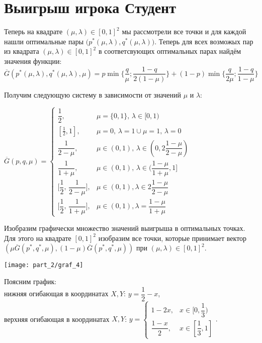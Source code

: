 \section{Выигрыш игрока Студент}

\quad Теперь на квадрате $(\mu, \lambda) \in [0, 1]^2$ мы рассмотрели
все точки и для каждой нашли оптимальные пары 
$\big(p^*(\mu, \lambda), q^*(\mu, \lambda)\big)$.
Теперь для всех возможых пар из квадрата
$(\mu, \lambda) \in [0, 1]^2$ в соответсвующих
оптимальных парах найдём значения функции:
$$
	\overline G(p^*(\mu, \lambda), q^*(\mu, \lambda), \mu)=
	p \min \Big\{
		\dfrac{q}{\mu};
		\dfrac{1-q}{2(1-\mu)}
	\Big\} + (1 - p) \min \Big\{
		\dfrac{q}{2\mu};
		\dfrac{1 - q}{1 - \mu}
	\Big\}
$$

Получим следующую систему в зависимости от значений  $\mu$ и $\lambda$:

$\overline G(p, q, \mu) =
\begin{cases}
	\dfrac{1}{2}, & 
	\mu = \{0,1\}, \, \lambda \in [0, 1) 
	\\
	[\frac{1}{2}, 1], & 
	\mu = 0, \, \lambda = 1 \cup 
	\mu = 1, \, \lambda = 0
	\\
	\dfrac{1}{2-\mu}, &	
	\mu \in (0, 1), \, \lambda \in 
	(0, 2\dfrac{1 - \mu}{2 - \mu})
	\\
	\dfrac{1}{1 + \mu}, & 
	\mu \in (0, 1), \, \lambda \in 
	(\dfrac{1 - \mu}{1 + \mu}, 1]
	\\
	\Big[
		\dfrac{1}{2}, \, \dfrac{1}{2-\mu}
	\Big], &
	\mu \in (0, 1), \lambda \in 2\dfrac{1 - \mu}{2 - \mu}
	\\ 
	\Big[
		\dfrac{1}{2}, \, \dfrac{1}{1+\mu}
	\Big], &
	\mu \in (0,1), \lambda = \dfrac{1-\mu}{1+\mu}
\end{cases}
$

Изобразим графически множество значений выигрыша в оптимальных точках.
Для этого на квадрате $[0, 1]^{2}$ изобразим все точки, которые 
принимает вектор 
$(\mu \overline G(p^*,q^*,\mu), (1-\mu) \overline G(p^*,q^*,\mu))$ 
при $(\mu, \lambda) \in [0, 1]^2$.

\begin{center}
\texttt{[image: part\_2/graf\_4]}
\end{center}

Поясним график: \\
нижняя огибающая в координатах $X,Y$: $y=\dfrac{1}{2}-x$, \\
верхняя огибающая в координатах $X,Y$: 
$y=
\begin{cases}
	1 - 2x, & x \in [0, \dfrac{1}{3}) \\
	\dfrac{1 - x}{2}, & x \in [\dfrac{1}{3}, 1]
\end{cases}.
$